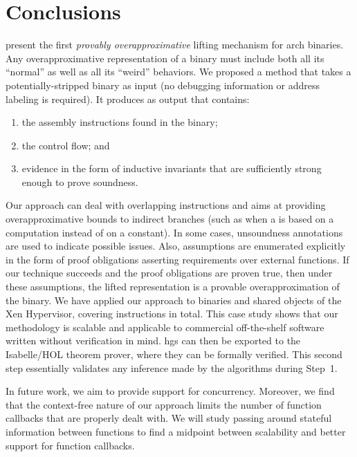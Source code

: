 \section{Conclusions}\label{hg-conclusion}
 present the first \emph{provably overapproximative} lifting mechanism for \gls{arch} binaries.
Any overapproximative representation of a binary must include both all its ``normal'' as well as all its ``weird'' behaviors.
We proposed a method that takes a potentially-stripped binary as input (no debugging information or address labeling is required).
It produces  as output that contains:
\begin{enumerate}
  \item the assembly instructions found in the binary;
  \item the control flow; and
  \item evidence in the form of inductive invariants that are sufficiently strong enough to prove soundness.
\end{enumerate}
Our approach can deal with overlapping instructions and aims at providing overapproximative bounds to indirect branches (such as when a  is based on a computation instead of on a constant).
In some cases, unsoundness annotations are used to indicate possible issues.
Also, assumptions are enumerated explicitly in the form of proof obligations asserting requirements over external functions.
If our technique succeeds and the proof obligations are proven true, then under these assumptions, the lifted representation is a provable overapproximation of the binary.
We have applied our approach to binaries and shared objects of the Xen Hypervisor, covering  instructions in total.
This case study shows that our methodology is scalable and applicable to commercial off-the-shelf software written without verification in mind.
\Acp{hg} can then be exported to the Isabelle/HOL theorem prover, where they can be formally verified.
This second step essentially validates any inference made by the algorithms during Step~1.

In future work, we aim to provide support for concurrency.
Moreover, we find that the context-free nature of our approach limits the number of function callbacks that are properly dealt with.
We will study passing around stateful information between functions to find a midpoint between scalability and better support for function callbacks.

